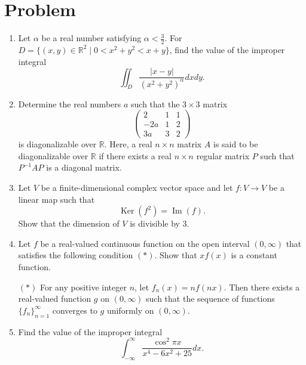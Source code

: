 \documentclass{article}
\begin{document}
\section*{Problem}
\begin{enumerate}[label=\fbox{\arabic*}]
  \item Let $\alpha$ be a real number satisfying $\alpha < \frac{3}{2}$. For $D = \{ (x, y) \in \mathbb{R}^2 \mid 0 < x^2 + y^2 < x + y \}$, find the value of the improper integral
        \[
          \iint_D \frac{|x - y|}{(x^2 + y^2)^\alpha} dx dy.
        \]

  \item Determine the real numbers $a$ such that the $3 \times 3$ matrix
        \[
          \begin{pmatrix} 2 & 1 & 1 \\ -2a & 1 & 2 \\ 3a & 3 & 2 \end{pmatrix}
        \]
        is diagonalizable over $\mathbb{R}$. Here, a real $n \times n$ matrix $A$ is said to be diagonalizable over $\mathbb{R}$ if there exists a real $n \times n$ regular matrix $P$ such that $P^{-1}AP$ is a diagonal matrix.

  \item Let $V$ be a finite-dimensional complex vector space and let $f : V \to V$ be a linear map such that
        \[
          \operatorname{Ker}(f^2) = \operatorname{Im}(f).
        \]
        Show that the dimension of $V$ is divisible by 3.

  \item Let $f$ be a real-valued continuous function on the open interval $(0, \infty)$ that satisfies the following condition $(\ast)$. Show that $x f(x)$ is a constant function.

        $(\ast)$ For any positive integer $n$, let $f_n(x) = nf(nx)$. Then there exists a real-valued function $g$ on $(0, \infty)$ such that the sequence of functions $\{f_n\}_{n=1}^\infty$ converges to $g$ uniformly on $(0, \infty)$.

  \item Find the value of the improper integral
        \[
          \int_{-\infty}^\infty \frac{\cos^2 \pi x}{x^4 - 6x^2 + 25} dx.
        \]


\end{enumerate}
\end{document}
